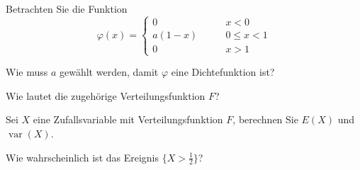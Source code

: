 Betrachten Sie die Funktion
\[
\varphi(x)=\begin{cases}
0&\qquad x < 0 \\
a(1 - x)&\qquad 0 \le x < 1\\
0&\qquad x>1
\end{cases}
\]
\begin{teilaufgaben}
\item Wie muss $a$ gewählt werden, damit $\varphi$ eine Dichtefunktion
ist?
\item Wie lautet die zugehörige Verteilungsfunktion $F$?
\item Sei $X$ eine Zufallsvariable mit Verteilungsfunktion $F$, berechnen
Sie $E(X)$ und $\operatorname{var}(X)$.
\item Wie wahrscheinlich ist das Ereignis $\{ X > \frac12\}$?
\end{teilaufgaben}

